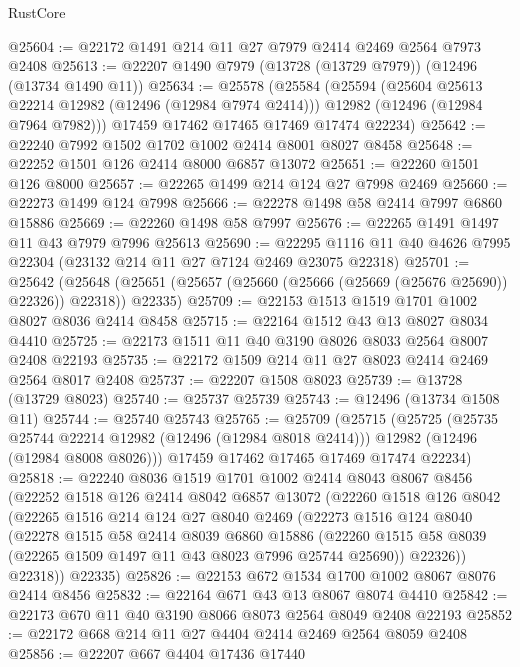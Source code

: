 \begin{lexlean}{RustCore}
\begin{coremodule}
@25604 := @22172 @1491 @214 @11 @27 @7979 @2414 @2469 @2564 @7973 @2408
@25613 := @22207 @1490 @7979 (@13728 (@13729 @7979)) (@12496 (@13734 @1490 @11))
@25634 := @25578
    (@25584
      (@25594
        (@25604 @25613 @22214 @12982 (@12496 (@12984 @7974 @2414)))
        @12982
        (@12496 (@12984 @7964 @7982)))
      @17459
      @17462
      @17465
      @17469
      @17474
      @22234)
@25642 := @22240 @7992 @1502 @1702 @1002 @2414 @8001 @8027 @8458
@25648 := @22252 @1501 @126 @2414 @8000 @6857 @13072
@25651 := @22260 @1501 @126 @8000
@25657 := @22265 @1499 @214 @124 @27 @7998 @2469
@25660 := @22273 @1499 @124 @7998
@25666 := @22278 @1498 @58 @2414 @7997 @6860 @15886
@25669 := @22260 @1498 @58 @7997
@25676 := @22265 @1491 @1497 @11 @43 @7979 @7996 @25613
@25690 := @22295 @1116 @11 @40 @4626 @7995 @22304 (@23132 @214 @11 @27 @7124 @2469 @23075 @22318)
@25701 := @25642
    (@25648 (@25651 (@25657 (@25660 (@25666 (@25669 (@25676 @25690)) @22326)) @22318)) @22335)
@25709 := @22153 @1513 @1519 @1701 @1002 @8027 @8036 @2414 @8458
@25715 := @22164 @1512 @43 @13 @8027 @8034 @4410
@25725 := @22173 @1511 @11 @40 @3190 @8026 @8033 @2564 @8007 @2408 @22193
@25735 := @22172 @1509 @214 @11 @27 @8023 @2414 @2469 @2564 @8017 @2408
@25737 := @22207 @1508 @8023
@25739 := @13728 (@13729 @8023)
@25740 := @25737 @25739
@25743 := @12496 (@13734 @1508 @11)
@25744 := @25740 @25743
@25765 := @25709
    (@25715
      (@25725
        (@25735 @25744 @22214 @12982 (@12496 (@12984 @8018 @2414)))
        @12982
        (@12496 (@12984 @8008 @8026)))
      @17459
      @17462
      @17465
      @17469
      @17474
      @22234)
@25818 := @22240
    @8036
    @1519
    @1701
    @1002
    @2414
    @8043
    @8067
    @8456
    (@22252
      @1518
      @126
      @2414
      @8042
      @6857
      @13072
      (@22260
        @1518
        @126
        @8042
        (@22265
          @1516
          @214
          @124
          @27
          @8040
          @2469
          (@22273
            @1516
            @124
            @8040
            (@22278
              @1515
              @58
              @2414
              @8039
              @6860
              @15886
              (@22260 @1515 @58 @8039 (@22265 @1509 @1497 @11 @43 @8023 @7996 @25744 @25690))
              @22326))
          @22318))
      @22335)
@25826 := @22153 @672 @1534 @1700 @1002 @8067 @8076 @2414 @8456
@25832 := @22164 @671 @43 @13 @8067 @8074 @4410
@25842 := @22173 @670 @11 @40 @3190 @8066 @8073 @2564 @8049 @2408 @22193
@25852 := @22172 @668 @214 @11 @27 @4404 @2414 @2469 @2564 @8059 @2408
@25856 := @22207 @667 @4404 @17436 @17440

\end{coremodule}
\end{lexlean}
